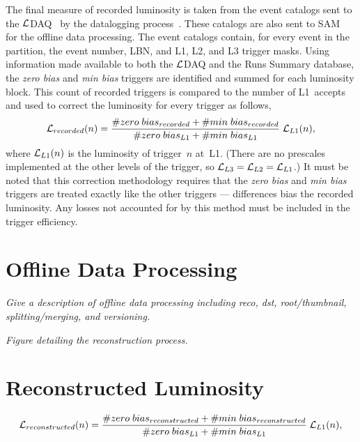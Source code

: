 \documentclass[12pt]{article}
\begin{document}
The final measure of recorded luminosity is taken from the event
catalogs sent to the $\cal L$DAQ~\cite{XXXX-LDAQ} by the datalogging
process~\cite{3982}.  These catalogs are also sent to SAM~\cite{3465}
for the offline data processing.  The event catalogs contain, for
every event in the partition, the event number, LBN, and L1, L2, and
L3 trigger masks.  Using information made available to both the $\cal
L$DAQ and the Runs Summary database, the {\it zero bias} and {\it min
bias} triggers are identified and summed for each luminosity block.
This count of recorded triggers is compared to the number of
L1~accepts and used to correct the luminosity for every trigger as
follows,
\begin{equation}
{\cal L}_{recorded}(n) = {\# zero\;bias_{recorded} + \#
min\;bias_{recorded} \over \# zero\;bias_{L1} + \# min\;bias_{L1}}
\;{\cal L}_{L1}(n),
\label{eq:recorded}
\end{equation}
where ${\cal L}_{L1}(n)$ is the luminosity of trigger~$n$
at~L1. (There are no prescales implemented at the other levels of the
trigger, so ${\cal L}_{L3} = {\cal L}_{L2} = {\cal L}_{L1}$.)  It must
be noted that this correction methodology requires that the {\it zero
bias} and {\it min bias} triggers are treated exactly like the other
triggers --- differences bias the recorded luminosity.  Any losses not
accounted for by this method must be included in the trigger
efficiency.

\section{Offline Data Processing}

{\it Give a description of offline data processing including reco, dst,
root/thumbnail, splitting/merging, and versioning.}

{\it Figure detailing the reconstruction process.}

\section{Reconstructed Luminosity}

\begin{equation}
{\cal L}_{reconstructed}(n) = {\# zero\;bias_{reconstructed} + \#
min\;bias_{reconstructed} \over \# zero\;bias_{L1} + \# min\;bias_{L1}}
\;{\cal L}_{L1}(n),
\label{eq:reconstructed}
\end{equation}


\newpage
% 
%

 
\end{document}
